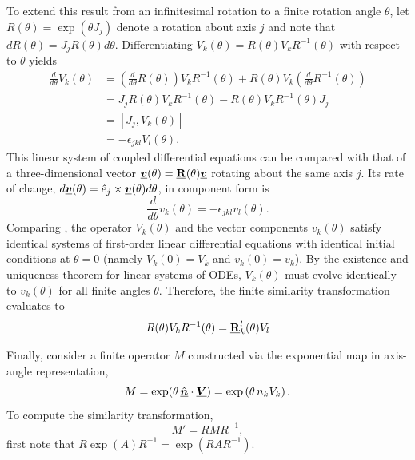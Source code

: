 To extend this result from an infinitesimal rotation to a finite rotation angle $\theta$, 
let $R(\theta)=\exp(\theta J_j)$ denote a rotation about axis $j$ and note that 
$dR(\theta) = J_j R(\theta) d\theta$. 
Differentiating $V_k(\theta)= R(\theta) V_k R^{-1}(\theta)$ with respect to $\theta$ yields
\begin{align} \label{eqn:ode_op}
\frac{d}{d\theta} V_k(\theta)
    &= \left( \frac{d}{d\theta} R(\theta) \right) V_k R^{-1}(\theta) + R(\theta) V_k \left( \frac{d}{d\theta} R^{-1}(\theta) \right) \nonumber \\
    &= J_j R(\theta) V_k R^{-1}(\theta) - R(\theta) V_k R^{-1}(\theta) J_j \nonumber \\
    &= [J_j, V_k(\theta)] \nonumber \\
    &= - \epsilon_{jkl} V_l(\theta).
\end{align}
This linear system of coupled differential equations can be compared with that of a three-dimensional
vector $\underline{\mbox{\boldmath $v$}}(\theta) = \underline{{\bf R}}(\theta)\underline{\mbox{\boldmath $v$}}$ rotating about the same axis $j$. 
Its rate of change, $d\underline{\mbox{\boldmath $v$}}(\theta) = \hat{e}_j \times \underline{\mbox{\boldmath $v$}}(\theta) d\theta$, in component form is
\begin{equation} \label{eqn:ode_vec}
    \frac{d}{d\theta} v_k(\theta) = -\epsilon_{jkl} v_l(\theta).
\end{equation}
Comparing , the operator $V_k(\theta)$ and the vector 
components $v_k(\theta)$ satisfy identical systems of first-order linear differential equations
with identical initial conditions at $\theta = 0$ (namely $V_k(0) = V_k$ and $v_k(0) = v_k$). 
%
By the existence and uniqueness theorem for linear systems of ODEs, $V_k(\theta)$ must evolve identically to $v_k(\theta)$ for all finite angles $\theta$. Therefore, the finite similarity transformation evaluates to
\begin{equation} \label{eqn:generator_rotation}
    R(\theta) V_k R^{-1}(\theta) = \underline{{\bf R}}_k^l(\theta) V_l
\end{equation}

Finally, consider a finite operator $M$ constructed via the exponential map in axis-angle representation,
\begin{equation}
    M = \exp(\theta \, \hat{\underline{\mbox{\boldmath $n$}}} \cdot \underline{\mbox{\boldmath $V$}}) = \exp\left( \theta \, n_k V_k \right).
\end{equation}
%
To compute the similarity transformation, 
$$M' = R M R^{-1},$$
first note that $R \exp(A) R^{-1} = \exp(R A R^{-1})$.

